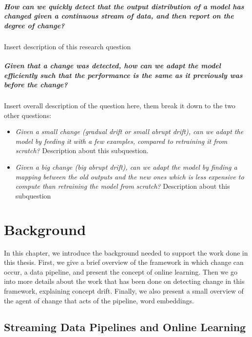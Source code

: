 \documentclass[12pt]{extreport}
\begin{document}
\paragraph*{How can we quickly detect that the output distribution of a model has changed given a continuous stream of data, and then report on the degree of change?} Insert description of this research question

\paragraph*{Given that a change was detected, how can we adapt the model efficiently such that the performance is the same as it previously was before the change?} Insert overall description of the question here, them break it down to the two other questions:
\begin{itemize}
    \item \emph{Given a small change (gradual drift or small abrupt drift), can we adapt the model by feeding it with a few examples, compared to retraining it from scratch?} Description about this subquestion.
    \item \emph{Given a big change (big abrupt drift), can we adapt the model by finding a mapping between the old outputs and the new ones which is less expensive to compute than retraining the model from scratch?} Description about this subquestion
\end{itemize}

\chapter{Background}

In this chapter, we introduce the background needed to support the work done in this thesis. First, we give a brief overview of the framework in which change can occur, a data pipeline, and present the concept of online learning. Then we go into more details about the work that has been done on detecting change in this framework, explaining concept drift. Finally, we also present a small overview of the agent of change that acts of the pipeline, word embeddings.

\section{Streaming Data Pipelines and Online Learning}
\end{document}
